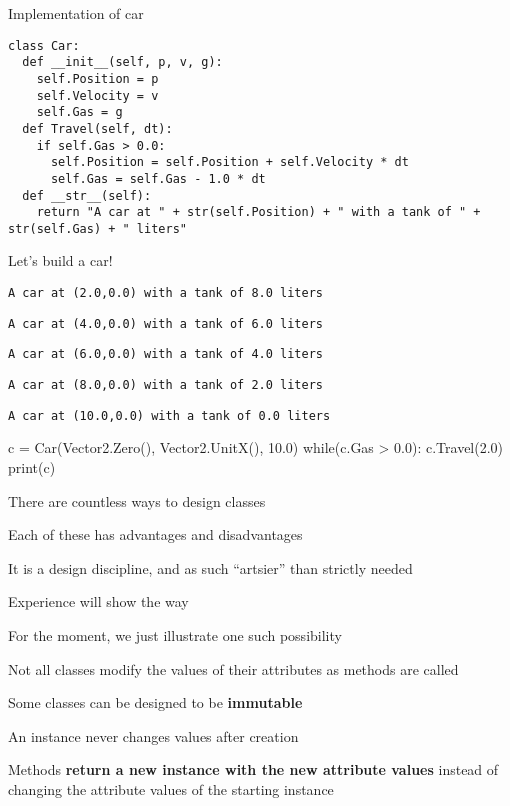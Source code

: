 \documentclass{beamer}
\begin{document}
\begin{frame}[fragile]{Implementation of car}
\begin{lstlisting}
class Car:
  def __init__(self, p, v, g):
    self.Position = p
    self.Velocity = v
    self.Gas = g
  def Travel(self, dt):
    if self.Gas > 0.0:
      self.Position = self.Position + self.Velocity * dt
      self.Gas = self.Gas - 1.0 * dt
  def __str__(self):
    return "A car at " + str(self.Position) + " with a tank of " + str(self.Gas) + " liters"
\end{lstlisting}
\end{frame}

\begin{frame}[fragile]{Let's build a car!}
\begin{codewithblock}{\pause \item \texttt{A car at (2.0,0.0) with a tank of 8.0 liters} \item \texttt{A car at (4.0,0.0) with a tank of 6.0 liters} \item \texttt{A car at (6.0,0.0) with a tank of 4.0 liters} \item \texttt{A car at (8.0,0.0) with a tank of 2.0 liters} \item \texttt{A car at (10.0,0.0) with a tank of 0.0 liters}}
c = Car(Vector2.Zero(), Vector2.UnitX(), 10.0)
while(c.Gas > 0.0):
  c.Travel(2.0)
  print(c)
\end{codewithblock}
\end{frame}

\begin{slide}{
\item There are countless ways to design classes
\item Each of these has advantages and disadvantages
\item It is a design discipline, and as such ``artsier'' than strictly needed
\item Experience will show the way
\item For the moment, we just illustrate one such possibility
}\end{slide}

\begin{slide}{
\item Not all classes modify the values of their attributes as methods are called
\item Some classes can be designed to be \textbf{immutable}
\item An instance never changes values after creation
\item Methods \textbf{return a new instance with the new attribute values} instead of changing the attribute values of the starting instance
}\end{slide}
\end{document}

